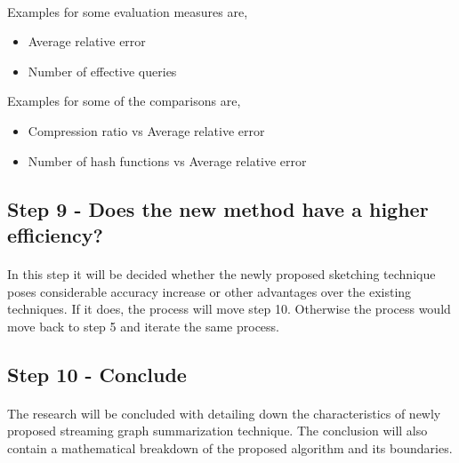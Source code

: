 \paragraph{}
Examples for some evaluation measures are,

\begin{itemize}
    \item Average relative error\cite{zhao_gsketch:_2011}
    \item Number of effective queries\cite{zhao_gsketch:_2011}
\end{itemize}

Examples for some of the comparisons are,

\begin{itemize}
    \item Compression ratio vs Average relative error
    \item Number of hash functions vs Average relative error
\end{itemize}

\subsection*{Step 9 - Does the new method have a higher efficiency?}

\paragraph{}
In this step it will be decided whether the newly proposed sketching technique poses considerable accuracy increase or other advantages over the existing techniques. If it does, the process will move step 10. Otherwise the process would move back to step 5 and iterate the same process.

\subsection*{Step 10 - Conclude}

\paragraph{}
The research will be concluded with detailing down the characteristics of newly proposed streaming graph summarization technique. The conclusion will also contain a mathematical breakdown of the proposed algorithm and its boundaries.
